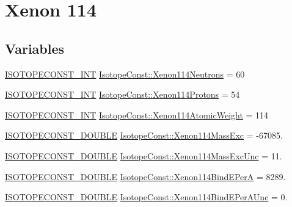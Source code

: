\hypertarget{group___isotope_const-_xenon-_xe114}{}\section{Xenon 114}
\label{group___isotope_const-_xenon-_xe114}
\subsection*{Variables}
\begin{DoxyCompactItemize}
\item 
\mbox{\hyperlink{group___isotope_const-_macros_ga5f18360b3e99483a35c32d789e62621c}{I\+S\+O\+T\+O\+P\+E\+C\+O\+N\+S\+T\+\_\+\+I\+NT}} \mbox{\hyperlink{group___isotope_const-_xenon-_xe114_gab45a6308fd9d01361efa4d243e7f8fbb}{Isotope\+Const\+::\+Xenon114\+Neutrons}} = 60
\item 
\mbox{\hyperlink{group___isotope_const-_macros_ga5f18360b3e99483a35c32d789e62621c}{I\+S\+O\+T\+O\+P\+E\+C\+O\+N\+S\+T\+\_\+\+I\+NT}} \mbox{\hyperlink{group___isotope_const-_xenon-_xe114_gace0e9e96f2f571748b4297285ce7cbc2}{Isotope\+Const\+::\+Xenon114\+Protons}} = 54
\item 
\mbox{\hyperlink{group___isotope_const-_macros_ga5f18360b3e99483a35c32d789e62621c}{I\+S\+O\+T\+O\+P\+E\+C\+O\+N\+S\+T\+\_\+\+I\+NT}} \mbox{\hyperlink{group___isotope_const-_xenon-_xe114_gae7f6101c31a21f829cb996441941be39}{Isotope\+Const\+::\+Xenon114\+Atomic\+Weight}} = 114
\item 
\mbox{\hyperlink{group___isotope_const-_macros_ga8f45a7272ce02c0b4c65c44636ed719a}{I\+S\+O\+T\+O\+P\+E\+C\+O\+N\+S\+T\+\_\+\+D\+O\+U\+B\+LE}} \mbox{\hyperlink{group___isotope_const-_xenon-_xe114_gac65039c07a4e10522f382cb07c576dcc}{Isotope\+Const\+::\+Xenon114\+Mass\+Exc}} = -\/67085.
\item 
\mbox{\hyperlink{group___isotope_const-_macros_ga8f45a7272ce02c0b4c65c44636ed719a}{I\+S\+O\+T\+O\+P\+E\+C\+O\+N\+S\+T\+\_\+\+D\+O\+U\+B\+LE}} \mbox{\hyperlink{group___isotope_const-_xenon-_xe114_ga30c3e4c603d6e3e4a0d991af37845d2c}{Isotope\+Const\+::\+Xenon114\+Mass\+Exc\+Unc}} = 11.
\item 
\mbox{\hyperlink{group___isotope_const-_macros_ga8f45a7272ce02c0b4c65c44636ed719a}{I\+S\+O\+T\+O\+P\+E\+C\+O\+N\+S\+T\+\_\+\+D\+O\+U\+B\+LE}} \mbox{\hyperlink{group___isotope_const-_xenon-_xe114_ga28b37c239db4eaab878f3330fecd6d3d}{Isotope\+Const\+::\+Xenon114\+Bind\+E\+PerA}} = 8289.
\item 
\mbox{\hyperlink{group___isotope_const-_macros_ga8f45a7272ce02c0b4c65c44636ed719a}{I\+S\+O\+T\+O\+P\+E\+C\+O\+N\+S\+T\+\_\+\+D\+O\+U\+B\+LE}} \mbox{\hyperlink{group___isotope_const-_xenon-_xe114_gad6187571dde262d1b49efb091c8bd8e3}{Isotope\+Const\+::\+Xenon114\+Bind\+E\+Per\+A\+Unc}} = 0.

\end{DoxyCompactItemize}
